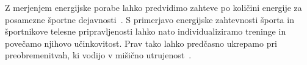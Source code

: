 Z merjenjem energijske porabe lahko predvidimo zahteve po količini energije za posamezne športne dejavnosti~\cite{botton2011energy,osgnach2010energy}. S primerjavo energijske zahtevnosti športa in športnikove telesne pripravljenosti lahko nato individualiziramo treninge in povečamo njihovo učinkovitost. Prav tako lahko predčasno ukrepamo pri preobremenitvah, ki vodijo v mišično utrujenost~\cite{sahlin1998energy,reilly1997energetics}.

\renewcommand{\folder}{./pogl/01-uvod}




